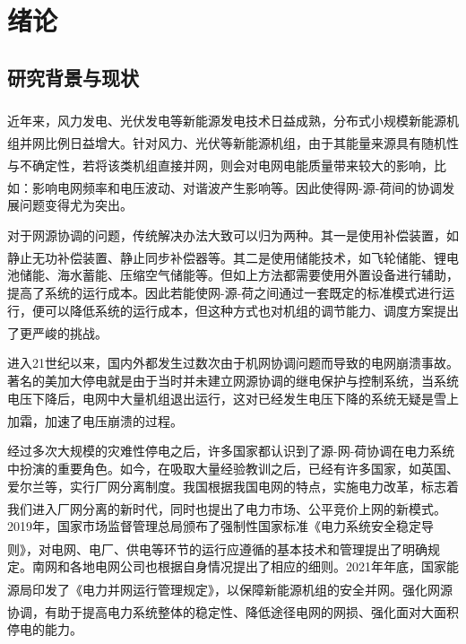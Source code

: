 \documentclass[winfonts,UTF8,a4paper]{ctexart}
\newcommand{\upcite}[1]{\textsuperscript{\textsuperscript{\cite{#1}}}}
\begin{document}
    
    
    \tableofcontents
 \thispagestyle{empty}
 \newpage


\pagestyle{fancy}
\fancyhf{}
\fancyfoot[R]{\thepage}
\setcounter{page}{1}
\newpage
\section{绪论}
\subsection{研究背景与现状}
近年来，风力发电、光伏发电等新能源发电技术日益成熟\upcite{田皓2021基于趋势理论的源}，分布式小规模新能源机组并网比例日益增大\upcite{陈锴2020考虑输电断面限制的风,宋杰2021蓄热式电采暖负荷参与风电消纳运行策略研究}。针对风力、光伏等新能源机组，由于其能量来源具有随机性与不确定性\upcite{高阳2010基于噪声场合下}，若将该类机组直接并网，则会对电网电能质量带来较大的影响，比如：影响电网频率和电压波动、对谐波产生影响等\upcite{郭俊飞2015探讨风电场并网运行对电网电能质量的影响}。因此使得网-源-荷间的协调发展问题变得尤为突出。

对于网源协调的问题，传统解决办法大致可以归为两种。其一是使用补偿装置，如静止无功补偿装置、静止同步补偿器等\upcite{田广青1995静止无功补偿技术与应用,田广青1996静止无功补偿技术与应用}。其二是使用储能技术\upcite{周皓2021改善风电并网电能质量的飞轮储能系统能量管理系统设计,张维煜2014飞轮储能关键技术及其发展现状,李军徽201810,沈冠冶2018考虑风电并网系统的储能优化配置}，如飞轮储能、锂电池储能、海水蓄能、压缩空气储能等。但如上方法都需要使用外置设备进行辅助，提高了系统的运行成本。因此若能使网-源-荷之间通过一套既定的标准模式进行运行，便可以降低系统的运行成本，但这种方式也对机组的调节能力、调度方案提出了更严峻的挑战\upcite{ma2019parameter}。

进入21世纪以来，国内外都发生过数次由于机网协调问题而导致的电网崩溃事故。著名的美加大停电就是由于当时并未建立网源协调的继电保护与控制系统，当系统电压下降后，电网中大量机组退出运行，这对已经发生电压下降的系统无疑是雪上加霜，加速了电压崩溃的过程\upcite{印永华2003美加,王景瑞2004整饬电力市场资源秩序}。

经过多次大规模的灾难性停电之后，许多国家都认识到了源-网-荷协调在电力系统中扮演的重要角色。如今，在吸取大量经验教训之后，已经有许多国家，如英国、爱尔兰等，实行厂网分离制度。我国根据我国电网的特点，实施电力改革，标志着我们进入厂网分离的新时代，同时也提出了电力市场、公平竞价上网的新模式\upcite{丁晓冬2015热电联产机组间热电负荷优化分配的研究}。2019年，国家市场监督管理总局颁布了强制性国家标准《电力系统安全稳定导则》\upcite{电力系统安全稳定导则}，对电网、电厂、供电等环节的运行应遵循的基本技术和管理提出了明确规定。南网和各地电网公司也根据自身情况提出了相应的细则。2021年年底，国家能源局印发了《电力并网运行管理规定》\upcite{电力并网运行管理规定}，以保障新能源机组的安全并网。强化网源协调，有助于提高电力系统整体的稳定性、降低途径电网的网损\upcite{陈征2016荷}、强化面对大面积停电的能力。
\end{document}
